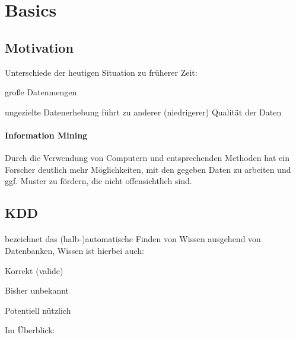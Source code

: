 \documentclass[10pt]{article} %
\begin{document}
\tableofcontents

\section{Basics}

\subsection{Motivation}

Unterschiede der heutigen Situation zu früherer Zeit:
\begin{cptitemize} 
      \item große Datenmengen
      \item ungezielte Datenerhebung führt zu anderer (niedrigerer) Qualität der Daten 
\end{cptitemize} 

\paragraph{Information Mining} Durch die Verwendung von Computern und entsprechenden Methoden hat ein Forscher deutlich mehr Möglichkeiten, mit den gegeben Daten zu arbeiten und ggf. Muster zu fördern, die nicht offensichtlich sind.


\subsection{KDD}

\paragraph{} bezeichnet das (halb-)automatische Finden von Wissen ausgehend von Datenbanken, Wissen ist hierbei auch:
\begin{cptitemize} 
      \item Korrekt (valide)
      \item Bisher unbekannt
      \item Potentiell nützlich 
\end{cptitemize} 

Im Überblick:

\end{document}
